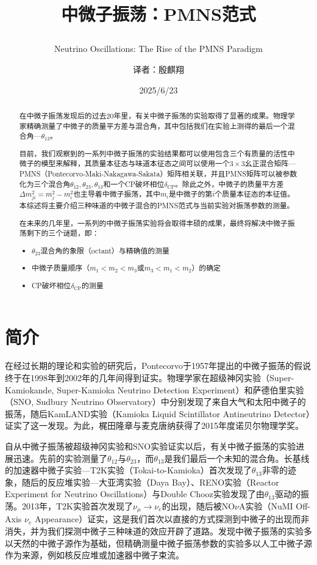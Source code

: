 \documentclass{article}
\title{中微子振荡：PMNS范式\\ \subtitle{Neutrino Oscillations: The Rise of the PMNS Paradigm}}
\author{译者：殷麒翔}
\date{2025/6/23}
\begin{document}
	\maketitle
	\begin{abstract}
		在中微子振荡发现后的过去20年里，有关中微子振荡的实验取得了显著的成果。物理学家精确测量了中微子的质量平方差与混合角，其中包括我们在实验上测得的最后一个混合角—$\theta_{13}$。
		
		目前，我们观察到的一系列中微子振荡的实验结果都可以使用包含三个有质量的活性中微子的模型来解释，其质量本征态与味道本征态之间可以使用一个$3\times3$幺正混合矩阵—PMNS（Pontecorvo-Maki-Nakagawa-Sakata）矩阵相关联，并且PMNS矩阵可以被参数化为三个混合角$\theta_{12},\theta_{23},\theta_{13}$和一个CP破坏相位$\delta_\mathrm{CP}$。除此之外，中微子的质量平方差$\Delta m_{ji}^2=m_j^2-m_i^2$也主导着中微子振荡，其中$m_i$是中微子的第$i$个质量本征态的本征值。本综述将主要介绍三种味道的中微子混合的PMNS范式与当前实验对振荡参数的测量。
		
		在未来的几年里，一系列的中微子振荡实验将会取得丰硕的成果，最终将解决中微子振荡剩下的三个谜题，即：
		\begin{itemize}
			\item $\theta_{23}$混合角的象限（octant）与精确值的测量
			\item 中微子质量顺序（$m_1<m_2<m_3$或$m_3<m_1<m_2$）的确定
			\item CP破坏相位$\delta_\mathrm{CP}$的测量
		\end{itemize}
	\end{abstract}
	\section{简介}
	在经过长期的理论和实验的研究后，Pontecorvo于1957年\cite{Pontecorvo1957}\cite{Pontecorvo1958b}提出的中微子振荡的假说终于在1998年到2002年的几年间得到证实。物理学家在超级神冈实验（Super-Kamiokande, Super-Kamioka
Neutrino Detection Experiment）\cite{Fukuda1998}和萨德伯里实验（SNO, Sudbury Neutrino Observatory）\cite{Ahmad2002}中分别发现了来自大气和太阳中微子的振荡，随后KamLAND实验（Kamioka Liquid Scintillator Antineutrino Detector）\cite{Eguchi2003}证实了这一发现。为此，梶田隆章与麦克唐纳获得了2015年度诺贝尔物理学奖。

	自从中微子振荡被超级神冈实验和SNO实验证实以后，有关中微子振荡的实验进展迅速。先前的实验测量了$\theta_{12}$与$\theta_{23}$，而$\theta_{13}$是我们最后一个未知的混合角。长基线的加速器中微子实验—T2K实验（Tokai-to-Kamioka）\cite{Abe2011}首次发现了$\theta_{13}$非零的迹象，随后的反应堆实验—大亚湾实验（Daya Bay）\cite{An2012}、RENO实验（Reactor Experiment for Neutrino Oscillations）\cite{Ahn2012}与Double Chooz实验\cite{Abe2012D}发现了由$\theta_{13}$驱动的振荡。2013年，T2K实验首次发现了$\nu_\mu\to\nu_e$的出现\cite{Abe2014}，随后被NO$\nu$A实验（NuMI Off-Axis $\nu_e$ Appearance）证实\cite{Adamson2017}，这是我们首次以直接的方式探测到中微子的出现而非消失，并为我们探测中微子三种味道的效应开辟了道路。发现中微子振荡的实验多以天然的中微子源作为基础，但精确测量中微子振荡参数的实验多以人工中微子源作为来源，例如核反应堆或加速器中微子束流。
	
\end{document}
